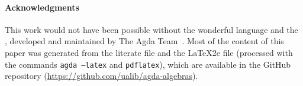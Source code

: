 


\paragraph*{Acknowledgments}
This work would not have been possible without the wonderful \agda language and the
\agdastdlib, developed and
maintained by The Agda Team~\cite{agdastdlib}.
Most of the content of this paper was generated from the literate \agda file \HSPlagda and the \LaTeX2e file \agdahsp (processed with the commands
\texttt{agda --latex} and \texttt{pdflatex}), which are available in the \agdaalgebras GitHub repository ({\small \url{https://github.com/ualib/agda-algebras}}).


